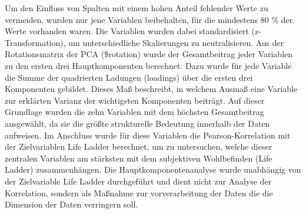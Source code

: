 \documentclass[
]{article}
\newenvironment{Shaded}{\begin{snugshade}}{\end{snugshade}}
\newcommand{\AttributeTok}[1]{\textcolor[rgb]{0.13,0.29,0.53}{#1}}
\newcommand{\ConstantTok}[1]{\textcolor[rgb]{0.56,0.35,0.01}{#1}}
\newcommand{\DecValTok}[1]{\textcolor[rgb]{0.00,0.00,0.81}{#1}}
\newcommand{\FloatTok}[1]{\textcolor[rgb]{0.00,0.00,0.81}{#1}}
\newcommand{\FunctionTok}[1]{\textcolor[rgb]{0.13,0.29,0.53}{\textbf{#1}}}
\newcommand{\NormalTok}[1]{#1}
\newcommand{\SpecialCharTok}[1]{\textcolor[rgb]{0.81,0.36,0.00}{\textbf{#1}}}
\newcommand{\StringTok}[1]{\textcolor[rgb]{0.31,0.60,0.02}{#1}}
\begin{document}
Um den Einfluss von Spalten mit einem hohen Anteil fehlender Werte zu
vermeiden, wurden nur jene Variablen beibehalten, für die mindestens 80
\% der Werte vorhanden waren. Die Variablen wurden dabei standardisiert
(z-Transformation), um unterschiedliche Skalierungen zu neutralisieren.
Aus der Rotationsmatrix der PCA (\$rotation) wurde der Gesamtbeitrag
jeder Variablen zu den ersten drei Hauptkomponenten berechnet. Dazu
wurde für jede Variable die Summe der quadrierten Ladungen (loadings)
über die ersten drei Komponenten gebildet. Dieses Maß beschreibt, in
welchem Ausmaß eine Variable zur erklärten Varianz der wichtigsten
Komponenten beiträgt. Auf dieser Grundlage wurden die zehn Variablen mit
dem höchsten Gesamtbeitrag ausgewählt, da sie die größte strukturelle
Bedeutung innerhalb der Daten aufweisen. Im Anschluss wurde für diese
Variablen die Pearson-Korrelation mit der Zielvariablen Life Ladder
berechnet, um zu untersuchen, welche dieser zentralen Variablen am
stärksten mit dem subjektiven Wohlbefinden (Life Ladder) zusammenhängen.
Die Hauptkomponentenanalyse wurde unabhängig von der Zielvariable Life
Ladder durchgeführt und dient nicht zur Analyse der Korrelation, sondern
als Maßnahme zur vorverarbeitung der Daten die die Dimension der Daten
verringern soll.

\begin{Shaded}
\end{Shaded}
\end{document}

